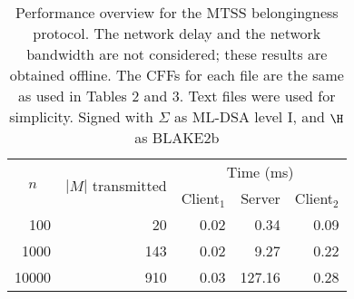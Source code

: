 
    \begin{table}[ht]
    \setlength{\tabcolsep}{10pt}
    \centering
    \caption{Performance overview for the MTSS belongingness protocol. The network delay and the network bandwidth
are not considered; these results are obtained offline. The CFFs for each file are the same as used in Tables 2 and 3. Text
files were used for simplicity. Signed with $\Sigma$ as ML-DSA level I, and $\H$ as BLAKE2b}
    \begin{tabular}{rrrrr}
        \toprule
        \multicolumn{1}{c}{\multirow{2}{*}{$n$}} &
            \multicolumn{1}{c}{\multirow{2}{*}{$|M|$ transmitted}} &
            \multicolumn{3}{c}{Time (ms)} \\

        \cmidrule{3-5}
        & & Client$_1$ & Server & Client$_2$ \\
        \cmidrule{1-5}
    100 & 20 & 0.02 & 0.34 & 0.09 \\
1000 & 143 & 0.02 & 9.27 & 0.22 \\
10000 & 910 & 0.03 & 127.16 & 0.28 \\

    \bottomrule
        \end{tabular}
        \label{table:belongingness-performance}
    \end{table}
